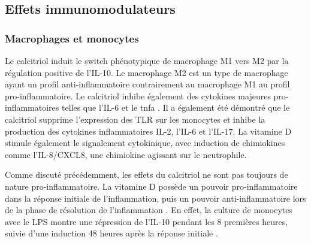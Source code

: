 \documentclass[
  a4paper,
  DIV=11,
  numbers=noendperiod,
  listof=totoc]{scrreprt}
\begin{document}
\subsection{Effets immunomodulateurs}\label{effets-immunomodulateurs}

\subsubsection{Macrophages et monocytes}\label{macrophages-et-monocytes}

Le calcitriol induit le switch phénotypique de macrophage M1 vers M2 par
la régulation positive de l'\ac{IL-10}. Le macrophage M2 est un type de
macrophage ayant un profil anti-inflammatoire contrairement au
macrophage M1 au profil pro-inflammatoire. Le calcitriol inhibe
également des cytokines majeures pro-inflammatoires telles que
l'\ac{IL-6} et le \ac{tnfa} \autocite{Meza-Meza.2022,Caprio.2017}. Il a
également été démontré que le calcitriol supprime l'expression des
\ac{TLR} sur les monocytes et inhibe la production des cytokines
inflammatoires \ac{IL-2}, l'\ac{IL-6} et l'\ac{IL-17}. La vitamine D
stimule également le signalement cytokinique, avec induction de
chimiokines comme l'IL-8/CXCL8, une chimiokine agissant sur le
neutrophile.

Comme discuté précédemment, les effets du calcitriol ne sont pas
toujours de nature pro-inflammatoire. La vitamine D possède un pouvoir
pro-inflammatoire dans la réponse initiale de l'inflammation, puis un
pouvoir anti-inflammatoire lors de la phase de résolution de
l'inflammation \autocite{Dankers.2017}. En effet, la culture de
monocytes avec le \ac{LPS} montre une répression de l'\ac{IL-10} pendant
les 8 premières heures, suivie d'une induction 48 heures après la
réponse initiale \autocite{Matilainen.2010}.
\end{document}

